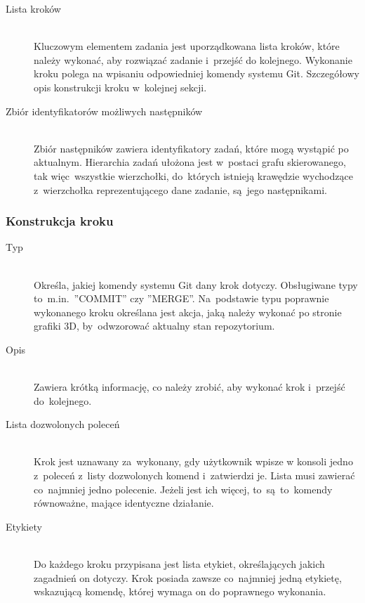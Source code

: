 \documentclass[12pt,a4paper,polish,thesis]{dcsbook}
\begin{document}
{\begin{description}
	\item[Lista kroków] \hfill \\
		Kluczowym elementem zadania jest uporządkowana lista kroków, które należy wykonać, aby rozwiązać zadanie i~przejść do kolejnego. Wykonanie kroku polega na wpisaniu odpowiedniej komendy systemu Git. Szczegółowy opis konstrukcji kroku w~kolejnej sekcji.
		
	\item[Zbiór identyfikatorów możliwych następników] \hfill \\
		Zbiór następników zawiera identyfikatory zadań, które mogą wystąpić po aktualnym. Hierarchia zadań ułożona jest w~postaci grafu skierowanego, tak więc~wszystkie wierzchołki, do~których istnieją krawędzie wychodzące z~wierzchołka reprezentującego dane zadanie, są~jego następnikami.	
	\end{description}

	\subsubsection{Konstrukcja kroku}
	
	\begin{description}
		\item[Typ] \hfill \\
		Określa, jakiej komendy systemu Git dany krok dotyczy. Obsługiwane typy to~m.in.~''COMMIT'' czy ''MERGE''. Na~podstawie typu poprawnie wykonanego kroku określana jest akcja, jaką należy wykonać po stronie grafiki 3D, by~odwzorować aktualny stan repozytorium.
		
		\item[Opis] \hfill \\
		Zawiera krótką informację, co należy zrobić, aby wykonać krok i~przejść do~kolejnego. 
		
		\item[Lista dozwolonych poleceń] \hfill \\
		Krok jest uznawany za~wykonany, gdy użytkownik wpisze w konsoli jedno z~poleceń z~listy dozwolonych komend i~zatwierdzi je. Lista musi zawierać co~najmniej jedno polecenie. Jeżeli jest ich więcej, to~są~to~komendy równoważne, mające identyczne działanie.
		
		\item[Etykiety] \hfill \\
		Do każdego kroku przypisana jest lista etykiet, określających jakich zagadnień on dotyczy. Krok posiada zawsze co~najmniej jedną etykietę, wskazującą komendę, której wymaga on do poprawnego wykonania. 
		

\end{description}}
\end{document}
